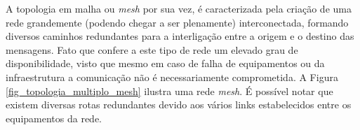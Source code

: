 
A topologia em malha ou \emph{mesh} por sua vez, é caracterizada pela criação de uma rede grandemente (podendo chegar a ser plenamente) interconectada, formando diversos caminhos redundantes para a interligação entre a origem e o destino das mensagens. Fato que confere a este tipo de rede um elevado grau de disponibilidade, visto que mesmo em caso de falha de equipamentos ou da infraestrutura a comunicação não é necessariamente comprometida. A Figura \ref{fig_topologia_multiplo_mesh} ilustra uma rede \emph{mesh}. É possível notar que existem diversas rotas redundantes devido aos vários links estabelecidos entre os equipamentos da rede.


